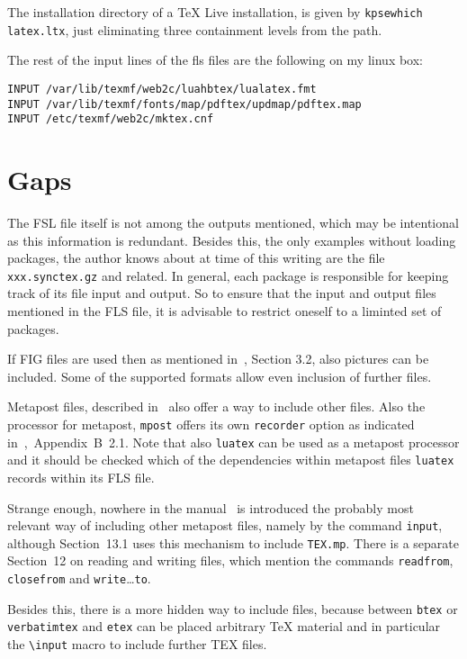 \documentclass[a4paper]{article}
\begin{document}
The installation directory of a \TeX{} Live installation, 
is given by \texttt{kpsewhich latex.ltx}, 
just eliminating three containment levels from the path. 

The rest of the input lines of the fls files are the following on my linux box: 
%
\begin{verbatim}
INPUT /var/lib/texmf/web2c/luahbtex/lualatex.fmt
INPUT /var/lib/texmf/fonts/map/pdftex/updmap/pdftex.map
INPUT /etc/texmf/web2c/mktex.cnf
\end{verbatim}

\section{Gaps}\label{sec:gaps}

The FSL file itself is not among the outputs mentioned, 
which may be intentional as this information is redundant. 
Besides this, the only examples without loading packages, 
the author knows about at time of this writing 
are the file \texttt{xxx.synctex.gz} and related. 
In general, each package is responsible for keeping track of its file input and output. 
So to ensure that the input and output files mentioned in the FLS file, 
it is advisable to restrict oneself to a liminted set of packages. 

If FIG files are used then as mentioned in~\cite{XFigF}, Section 3.2, 
also pictures can be included. 
Some of the supported formats allow even inclusion of further files. 

Metapost files, described in~\cite{MPost} also offer a way to include other files. 
Also the processor for metapost, \texttt{mpost} offers its own \texttt{recorder} option 
as indicated in~\cite{MPost},~Appendix~B~2.1. 
Note that also \texttt{luatex} can be used as a metapost processor 
and it should be checked which of the dependencies within metapost files 
\texttt{luatex} records within its FLS file. 

Strange enough, nowhere in the manual~\cite{MPost} 
is introduced the probably most relevant way of including other metapost files, 
namely by the command \texttt{input}, 
although Section~13.1 uses this mechanism to include \texttt{TEX.mp}. 
There is a separate Section~12 on reading and writing files, 
which mention the commands \texttt{readfrom}, \texttt{closefrom} 
and \texttt{write}\dots\texttt{to}. 

Besides this, there is a more hidden way to include files, 
because between \texttt{btex} or \texttt{verbatimtex} and \texttt{etex} 
can be placed arbitrary \TeX{} material 
and in particular the \texttt{\textbackslash{}input} macro to include further TEX files. 
\end{document}
